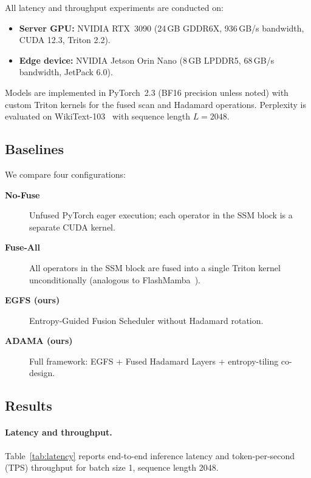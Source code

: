 \documentclass{article}
\begin{document}
All latency and throughput experiments are conducted on:
\begin{itemize}
  \item \textbf{Server GPU:} NVIDIA RTX~3090 (24\,GB GDDR6X, 936\,GB/s
        bandwidth, CUDA 12.3, Triton 2.2).
  \item \textbf{Edge device:} NVIDIA Jetson Orin Nano (8\,GB LPDDR5,
        68\,GB/s bandwidth, JetPack 6.0).
\end{itemize}
Models are implemented in PyTorch~2.3 (BF16 precision unless noted) with
custom Triton kernels for the fused scan and Hadamard operations.
Perplexity is evaluated on WikiText-103~\citep{merity2017pointer} with
sequence length $L = 2048$.

\subsection{Baselines}
\label{sec:exp:baselines}

We compare four configurations:
\begin{description}
  \item[\textbf{No-Fuse}] Unfused PyTorch eager execution; each operator in
        the SSM block is a separate CUDA kernel.
  \item[\textbf{Fuse-All}] All operators in the SSM block are fused into a
        single Triton kernel unconditionally (analogous to
        FlashMamba~\citep{dao2024mamba2}).
  \item[\textbf{EGFS (ours)}] Entropy-Guided Fusion Scheduler without
        Hadamard rotation.
  \item[\textbf{ADAMA (ours)}] Full framework: EGFS + Fused Hadamard Layers +
        entropy-tiling co-design.
\end{description}

\subsection{Results}
\label{sec:exp:results}

\paragraph{Latency and throughput.}
Table~\ref{tab:latency} reports end-to-end inference latency and
token-per-second (TPS) throughput for batch size 1, sequence length 2048.
\end{document}
